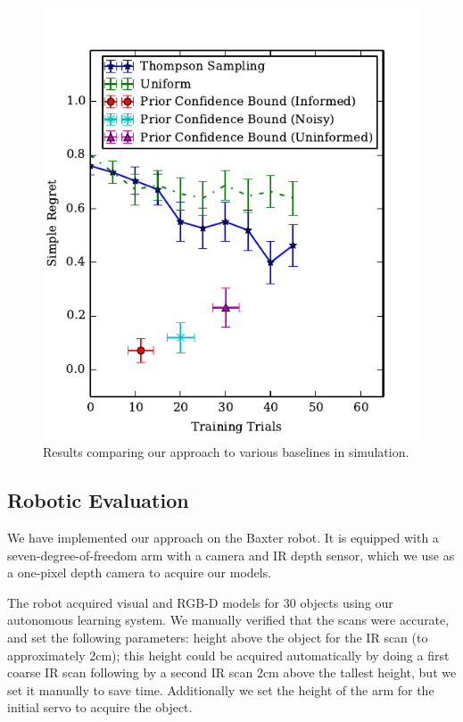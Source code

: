 \documentclass{article}
\begin{document}
\begin{figure}
\includegraphics{figures/bestarm.pdf}
\caption{Results comparing our approach to various baselines in simulation.\label{fig:simulation_results}}
\end{figure}


\subsection{Robotic Evaluation}

We have implemented our approach on the Baxter
robot. It is equipped with a seven-degree-of-freedom arm with a
camera and IR depth sensor, which we use as a one-pixel depth camera
to acquire our models.

The robot acquired visual and RGB-D models for 30 objects using our
autonomous learning system.  We manually verified that the scans were
accurate, and set the following parameters: height above the object
for the IR scan (to approximately 2cm); this height could be acquired
automatically by doing a first coarse IR scan following by a second IR
scan 2cm above the tallest height, but we set it manually to save
time.  Additionally we set the height of the arm for the initial servo
to acquire the object.
\end{document}
